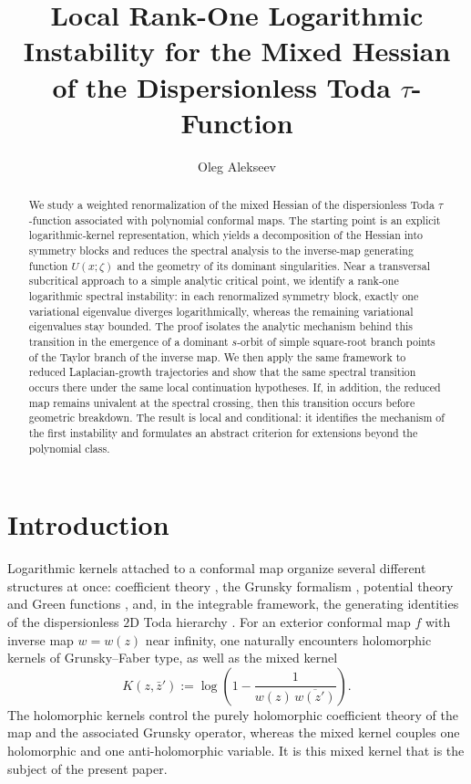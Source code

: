 \documentclass[11pt]{amsart}
\title[Local Rank-One Logarithmic Instability]
{Local Rank-One Logarithmic Instability for the Mixed Hessian of the Dispersionless Toda $\tau$-Function}
\author{Oleg Alekseev}
\date{}
\numberwithin{equation}{section}
\theoremstyle{plain}
\theoremstyle{definition}
\theoremstyle{remark}
\begin{document}
\begin{abstract}
We study a weighted renormalization of the mixed Hessian of the dispersionless Toda $\tau$-function associated with polynomial conformal maps. The starting point is an explicit logarithmic-kernel representation, which yields a decomposition of the Hessian into symmetry blocks and reduces the spectral analysis to the inverse-map generating function $U(x;\zeta)$ and the geometry of its dominant singularities.
Near a transversal subcritical approach to a simple analytic critical point, we identify a rank-one logarithmic spectral instability:
in each renormalized symmetry block, exactly one variational eigenvalue diverges logarithmically, whereas the remaining variational eigenvalues stay bounded.
The proof isolates the analytic mechanism behind this transition in the emergence of a dominant $s$-orbit of simple square-root branch points of the Taylor branch of the inverse map. We then apply the same framework to reduced Laplacian-growth trajectories and show that the same spectral transition occurs there under the same local continuation hypotheses. If, in addition, the reduced map remains univalent at the spectral crossing, then this transition occurs before geometric breakdown.
The result is local and conditional: it identifies the mechanism of the first instability and formulates an abstract criterion for extensions beyond the polynomial class.

\end{abstract}


\maketitle


\section{Introduction}
\label{sec:intro}


Logarithmic kernels attached to a conformal map organize several different
structures at once: coefficient theory \cite{Duren1983}, the Grunsky
formalism \cite{Pommerenke1992,Schiffer1981}, potential theory and Green
functions \cite{Bell1992}, and, in the integrable framework, the generating
identities of the dispersionless \(2\)D Toda hierarchy
\cite{WiegmannZabrodin2000,MarshakovWiegmannZabrodin2002,Teo2003,Teo2009,TakhtajanTeo2006}.
For an exterior conformal map \(f\) with inverse map \(w=w(z)\) near
infinity, one naturally encounters holomorphic kernels of Grunsky--Faber type,
as well as the mixed kernel
\[
K(z,\bar z')
:=
\log\!\left(1-\frac{1}{w(z)\,\overline{w(z')}}\right).
\]
The holomorphic kernels control the purely holomorphic coefficient theory of
the map and the associated Grunsky operator, whereas the mixed kernel couples
one holomorphic and one anti-holomorphic variable. It is this mixed kernel
that is the subject of the present paper.
\end{document}
